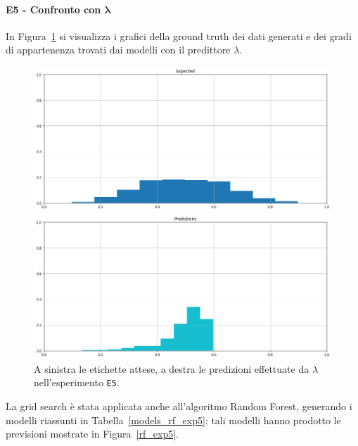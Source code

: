 \documentclass[12pt]{report}
\theoremstyle{definition}
\begin{document}
\paragraph{E5 - Confronto con $\bm{\lambda}$}
In Figura~\ref{prediction_exp5} si visualizza i grafici della ground truth dei dati generati e dei gradi di appartenenza trovati dai modelli con il predittore $\lambda$.
\begin{figure}
\centering
    \begin{minipage}{0.48\textwidth}
        \includegraphics[width=\linewidth]{images/experiment_beta5_sovrapposti/expected_memberships.png}
    \end{minipage}
    \begin{minipage}{0.48\textwidth}
        \includegraphics[width=\linewidth]{images/experiment_beta5_sovrapposti/prediction_memberships.png}
    \end{minipage}
    \caption{A sinistra le etichette attese, a destra le predizioni effettuate da $\lambda$ nell'esperimento \texttt{E5}.}
    \label{prediction_exp5}
\end{figure} 
La grid search è stata applicata anche all'algoritmo Random Forest, generando i modelli riassunti in Tabella~\ref{models_rf_exp5}; tali modelli hanno prodotto le previsioni mostrate in Figura~\ref{rf_exp5}.
\end{document}
